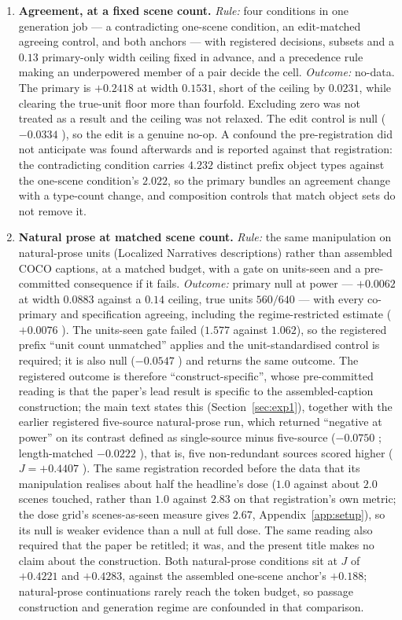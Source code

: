 \begin{enumerate}
\item \textbf{Agreement, at a fixed scene count.}
\emph{Rule:} four conditions in one generation job --- a contradicting one-scene condition, an
edit-matched agreeing control, and both anchors --- with registered decisions, subsets and a $0.13$
primary-only width ceiling fixed in advance, and a precedence rule making an underpowered member of
a pair decide the cell.
\emph{Outcome:} no-data. The primary is $+0.2418$  at width $0.1531$, short of
the ceiling by $0.0231$, while clearing the true-unit floor more than fourfold. Excluding zero was
not treated as a result and the ceiling was not relaxed. The edit control is null
($-0.0334$ ), so the edit is a genuine no-op. A confound the pre-registration
did not anticipate was found afterwards and is reported against that registration: the contradicting condition
carries $4.232$ distinct prefix object types against the one-scene condition's $2.022$, so the
primary bundles an agreement change with a type-count change, and composition controls that match
object sets do not remove it.

\item \textbf{Natural prose at matched scene count.}
\emph{Rule:} the same manipulation on natural-prose units (Localized Narratives descriptions) rather
than assembled COCO captions, at
a matched budget, with a gate on units-seen and a pre-committed consequence if it fails.
\emph{Outcome:} primary null at power --- $+0.0062$  at width $0.0883$ against
a $0.14$ ceiling, true units $560/640$ --- with every co-primary and specification agreeing, including
the regime-restricted estimate ($+0.0076$ ). The units-seen gate failed ($1.577$
against $1.062$), so the registered prefix ``unit count unmatched'' applies and the
unit-standardised control is required; it is also null ($-0.0547$ ) and returns the
same outcome. The registered outcome is therefore ``construct-specific'', whose pre-committed reading is
that the paper's lead result is specific to the assembled-caption construction; the main text states
this (Section~\ref{sec:exp1}), together with the earlier registered five-source natural-prose run, which
returned ``negative at power'' on its contrast defined as single-source minus five-source
($-0.0750$ ; length-matched $-0.0222$ ), that is, five
non-redundant sources scored higher ($J = {+0.4407}$ ). The same registration
recorded before the data that its manipulation realises about half the headline's dose ($1.0$ against
about $2.0$ scenes touched, rather than $1.0$ against $2.83$ on that registration's own metric; the
dose grid's scenes-as-seen measure gives $2.67$, Appendix~\ref{app:setup}), so its null is weaker evidence than a null
at full dose. The same reading also required that
the paper be retitled; it was, and the present title makes no claim about the construction. Both natural-prose conditions sit at $J$ of $+0.4221$ and $+0.4283$,
against the assembled one-scene anchor's $+0.188$; natural-prose continuations rarely reach the token
budget, so passage construction and generation regime are confounded in that comparison.


\end{enumerate}
